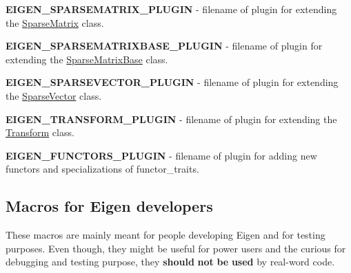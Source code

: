 \begin{DoxyItemize}
\item {\bfseries E\+I\+G\+E\+N\+\_\+\+S\+P\+A\+R\+S\+E\+M\+A\+T\+R\+I\+X\+\_\+\+P\+L\+U\+G\+IN} -\/ filename of plugin for extending the \hyperlink{group___sparse_core___module_class_eigen_1_1_sparse_matrix}{Sparse\+Matrix} class.
\item {\bfseries E\+I\+G\+E\+N\+\_\+\+S\+P\+A\+R\+S\+E\+M\+A\+T\+R\+I\+X\+B\+A\+S\+E\+\_\+\+P\+L\+U\+G\+IN} -\/ filename of plugin for extending the \hyperlink{group___sparse_core___module_class_eigen_1_1_sparse_matrix_base}{Sparse\+Matrix\+Base} class.
\item {\bfseries E\+I\+G\+E\+N\+\_\+\+S\+P\+A\+R\+S\+E\+V\+E\+C\+T\+O\+R\+\_\+\+P\+L\+U\+G\+IN} -\/ filename of plugin for extending the \hyperlink{group___sparse_core___module_class_eigen_1_1_sparse_vector}{Sparse\+Vector} class.
\item {\bfseries E\+I\+G\+E\+N\+\_\+\+T\+R\+A\+N\+S\+F\+O\+R\+M\+\_\+\+P\+L\+U\+G\+IN} -\/ filename of plugin for extending the \hyperlink{group___geometry___module_class_eigen_1_1_transform}{Transform} class.
\item {\bfseries E\+I\+G\+E\+N\+\_\+\+F\+U\+N\+C\+T\+O\+R\+S\+\_\+\+P\+L\+U\+G\+IN} -\/ filename of plugin for adding new functors and specializations of functor\+\_\+traits.
\end{DoxyItemize}\hypertarget{_topic_preprocessor_directives_TopicPreprocessorDirectivesDevelopers}{}\subsection{Macros for Eigen developers}\label{_topic_preprocessor_directives_TopicPreprocessorDirectivesDevelopers}
These macros are mainly meant for people developing Eigen and for testing purposes. Even though, they might be useful for power users and the curious for debugging and testing purpose, they {\bfseries should} {\bfseries not} {\bfseries be} {\bfseries used} by real-\/word code.


